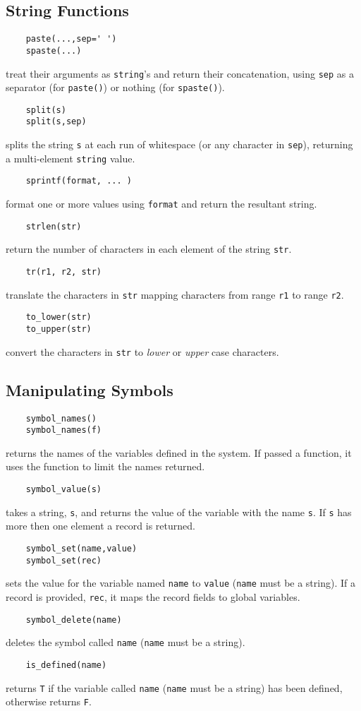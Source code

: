 \subsection{String Functions}
\begin{verbatim}
    paste(...,sep=' ')
    spaste(...)
\end{verbatim}
treat their arguments as {\tt string}'s and return their concatenation,
using {\tt sep} as a separator (for {\tt paste()}) or
nothing (for {\tt spaste()}).
\begin{verbatim}
    split(s)
    split(s,sep)
\end{verbatim}
splits the string {\tt s} at each run of whitespace (or any character
in {\tt sep}), returning a multi-element {\tt string} value.
\begin{verbatim}
    sprintf(format, ... )
\end{verbatim}
format one or more values using {\tt format} and return the resultant
string.
\begin{verbatim}
    strlen(str)
\end{verbatim}
return the number of characters in each element of the string {\tt str}.
\begin{verbatim}
    tr(r1, r2, str)
\end{verbatim}
translate the characters in {\tt str} mapping characters from range
{\tt r1} to range {\tt r2}.
\begin{verbatim}
    to_lower(str)
    to_upper(str)
\end{verbatim}
convert the characters in {\tt str} to {\em lower} or {\em upper}
case characters.

\subsection{Manipulating Symbols}
\begin{verbatim}
    symbol_names()
    symbol_names(f)
\end{verbatim}
returns the names of the variables defined in the system. If passed a function,
it uses the function to limit the names returned.
\begin{verbatim}
    symbol_value(s)
\end{verbatim}
takes a string, {\tt s}, and returns the value of the variable with the name {\tt s}.
If {\tt s} has more then one element a record is returned.
\begin{verbatim}
    symbol_set(name,value)
    symbol_set(rec)
\end{verbatim}
sets the value for the variable named {\tt name} to {\tt value} ({\tt name} must be
a string). If a record is provided, {\tt rec}, it maps the record fields to global
variables.
\begin{verbatim}
    symbol_delete(name)
\end{verbatim}
deletes the symbol called {\tt name} ({\tt name} must be a string).
\begin{verbatim}
    is_defined(name)
\end{verbatim}
returns {\tt T} if the variable called {\tt name} ({\tt name} must be a string) has
been defined, otherwise returns {\tt F}.

